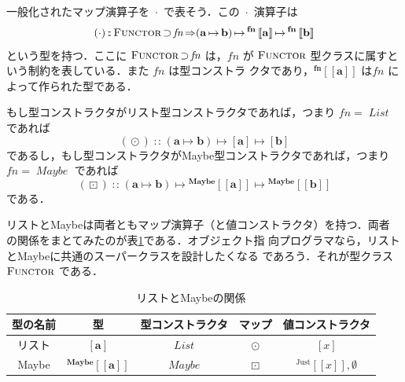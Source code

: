 \documentclass[a5paper,twoside,fleqn,draft]{jsbook}
\def\[{\left[\!\left[}
\def\]{\right]\!\right]}
\DeclareMathOperator{\mSuperClass}{\Rightarrow}
\DeclareMathOperator{\mSuperSet}{\supset}
\newcommand{\mNothing}{\emptyset}
\DeclareMathOperator{\mIn}{{:\!:}}
\DeclareMathOperator{\mMap}{\cdot} %
\DeclareMathOperator{\mMapList}{\odot}
\DeclareMathOperator{\mMapMaybe}{\boxdot}
\DeclareMathOperator{\mMapsTo}{\mapsto}
\newcommand{\mType}[1]{\mathbf{#1}}
\newcommand{\mListType}[1]{[\mType{#1}]}
\newcommand{\mGenericTypeAssemble}[2]{{}^{\mType{#1}}\[\mType{#2}\]}
\newcommand{\mMaybeType}[1]{\mGenericTypeAssemble{Maybe}{#1}}
\newcommand{\mTypeConstructor}[1]{\textit{#1}}
\DeclareMathOperator{\mListTypeConstructor}{\mTypeConstructor{List}}
\DeclareMathOperator{\mMaybeTypeConstructor}{\mTypeConstructor{Maybe}}
\newcommand{\mValueConstructor}[1]{\mathrm{#1}}
\newcommand{\mGenericValueAssemble}[2]{{}^\mValueConstructor{#1}\[#2\]}
\newcommand{\mJustWith}[1]{\mGenericValueAssemble{Just}{#1}}
\newcommand{\mListWith}[1]{\left[#1\right]}
\newcommand{\mGenericTypeClass}[1]{\textsc{#1}} %
\newcommand{\mFunctorTypeClass}{\mGenericTypeClass{Functor}}
\newcommand{\mProj}[2]{#1\mMapsTo#2}
\begin{document}
一般化されたマップ演算子を $\mMap$ で表そう．この $\mMap$ 演算子は
\begin{equation}
(\mMap)
\mIn{}\mFunctorTypeClass\mSuperSet\mTypeConstructor{fn}
\mSuperClass\mProj{
  \mProj{(\mProj{\mType{a}}{\mType{b}})}
        {\mGenericTypeAssemble{fn}{a}}}
                  {\mGenericTypeAssemble{fn}{b}}
\end{equation}
という型を持つ．ここに
$\mFunctorTypeClass\mSuperSet\mTypeConstructor{fn}$ は，$\mTypeConstructor{fn}$ が $\mFunctorTypeClass$ 型クラスに属すという制約を表している．また $\mTypeConstructor{fn}$ は型コンストラ
クタであり，$\mGenericTypeAssemble{fn}{a}$ は$\mTypeConstructor{fn}$ に
よって作られた型である．

もし型コンストラクタがリスト型コンストラクタであれば，つまり
$\mTypeConstructor{fn}=\mListTypeConstructor$ であれば
\begin{equation}
  (\mMapList)\mIn{}\mProj{\mProj{(\mProj{\mType{a}}
      {\mType{b}})}{\mListType{a}}}{\mListType{b}}
\end{equation}
であるし，もし型コンストラクタがMaybe型コンストラクタであれば，つまり
$\mTypeConstructor{fn}=\mMaybeTypeConstructor$ であれば
\begin{equation}
  (\mMapMaybe)\mIn{}\mProj{\mProj{(\mProj{\mType{a}}{\mType{b}})}
    {\mMaybeType{a}}}{\mMaybeType{b}}
\end{equation}
である．

リストとMaybeは両者ともマップ演算子（と値コンストラクタ）を持つ．両者
の関係をまとてみたのが表\ref{tab:list-and-maybe}である．オブジェクト指
向プログラマなら，リストとMaybeに共通のスーパークラスを設計したくなる
であろう．それが型クラス $\mFunctorTypeClass$ である．

\begin{table}
\label{tab:list-and-maybe}
\caption{リストとMaybeの関係}
\begin{center}
\begin{tabular}{||c|c|c|c|c||}\hline
型の名前&型&型コンストラクタ&マップ&値コンストラクタ\\\hline\hline
リスト&$\mListType{a}$&$\mListTypeConstructor$&$\mMapList$&$\mListWith{x}$\\
Maybe&$\mMaybeType{a}$&$\mMaybeTypeConstructor$&$\mMapMaybe$&$\mJustWith{x},\mNothing$\\\hline
\end{tabular}
\end{center}
\end{table}

\end{document}
